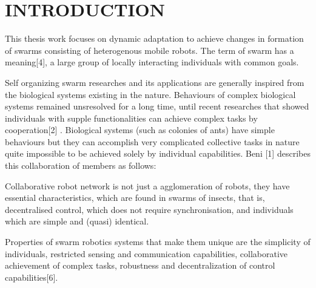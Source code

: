 

\chapter{INTRODUCTION}
\label{chp:introduction}

This thesis work focuses on dynamic adaptation to achieve changes in formation of swarms consisting of heterogenous mobile robots. The term of swarm has a meaning[4], a large group of locally interacting individuals with common goals. 

Self organizing swarm researches and its applications are generally inspired from the biological systems existing in the nature. Behaviours of complex biological systems remained unsresolved for a long time, until recent researches that showed individuals with supple functionalities can achieve complex tasks by cooperation[2] . Biological systems (such as colonies of ants) have simple behaviours but they can accomplish very complicated collective tasks in nature quite impossible to be achieved solely by individual capabilities. Beni [1] describes this collaboration of members as follows:

Collaborative robot network is not just a agglomeration of robots, they have essential characteristics, which are found in swarms of insects, that is, decentralised control, which does not require synchronisation, and individuals which are simple and (quasi) identical.

Properties of swarm robotics systems that make them unique are the simplicity of individuals, restricted sensing and communication capabilities, collaborative achievement of complex tasks, robustness and decentralization of control capabilities[6].

